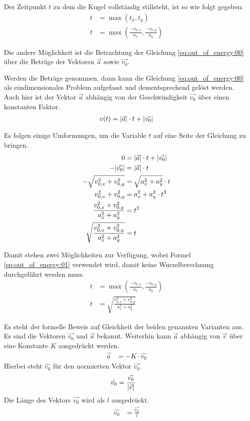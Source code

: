 Der Zeitpunkt $t$ zu dem die Kugel vollständig stillsteht, ist so wie folgt gegeben:
\begin{align}
    t &= \max{(t_x, t_y)}\\
    t &= \max{(\frac{-v_{0,x}}{a_x}, \frac{-v_{0,y}}{a_y})}
\end{align}

Die andere Möglichkeit ist die Betrachtung der Gleichung \ref{eq:out_of_energy:00} über die Beträge der Vektoren
$\vec{a}$ sowie $\vec{v_0}$.

Werden die Beträge genommen, dann kann die Gleichung \ref{eq:out_of_energy:00} als eindimensionales Problem aufgefasst und
dementsprechend gelöst werden. Auch hier ist der Vektor $\vec{a}$ abhängig von der Geschwindigkeit $\vec{v_0}$ über einen
konstanten Faktor.
\begin{align}
    v(t) = \lvert \vec{a} \rvert \cdot t + \lvert \vec{v_0} \rvert
\end{align}

Es folgen einige Umformungen, um die Variable $t$ auf eine Seite der Gleichung zu bringen.
\begin{align}
    0 &= \lvert \vec{a} \rvert \cdot t + \lvert \vec{v_0} \rvert\\
    -\lvert \vec{v_0} \rvert &= \lvert \vec{a} \rvert \cdot t\\
    -\sqrt{v_{0,x}^2 + v_{0,y}^2} &= \sqrt{a_x^2 + a_y^2} \cdot t\\
    v_{0,x}^2 + v_{0,y}^2 &= a_x^2 + a_y^2 \cdot t^2\\
    \frac{v_{0,x}^2 + v_{0,y}^2}{a_x^2 + a_y^2} &= t^2\\
    \sqrt{\frac{v_{0,x}^2 + v_{0,y}^2}{a_x^2 + a_y^2}} &= t
\end{align}

Damit stehen zwei Möglichkeiten zur Verfügung, wobei Formel \ref{eq:out_of_energy:01} verwendet wird, damit
keine Wurzelberechnung durchgeführt werden muss.
\begin{align}
    t &= \max{(\frac{-v_{0,x}}{a_x}, \frac{-v_{0,y}}{a_y})}\label{eq:out_of_energy:01}\\
    t &= \sqrt{\frac{v_{0,x}^2 + v_{0,y}^2}{a_x^2 + a_y^2}}
\end{align}

Es steht der formelle Beweis auf Gleichheit der beiden genannten Varianten aus.
Es sind die Vektoren $\vec{v_0}$ und $\vec{a}$ bekannt. Weiterhin kann $\vec{a}$ abhängig von $\vec{v}$
über eine Konstante $K$ ausgedrückt werden.
\begin{align}
    \vec{a} &= -K \cdot \hat{v_0}
\end{align}
Hierbei steht $\hat{v_0}$ für den normierten Vektor $\vec{v_0}$.
\begin{align}
    \hat{v_0} &= \frac{\vec{v_0}}{\lvert \vec{v} \rvert}
\end{align}
Die Länge des Vektors $\vec{v_0}$ wird als $l$ ausgedrückt.
\begin{align}
    \hat{v_0} &= \frac{\vec{v_0}}{l}
\end{align}

